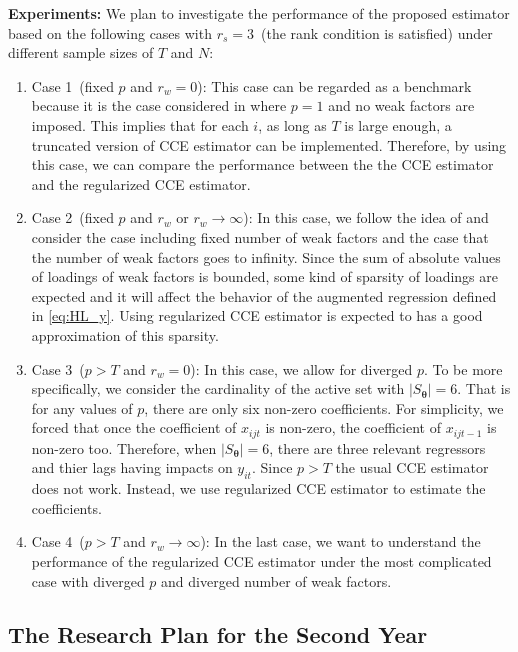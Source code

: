 \documentclass[11pt,a4paper]{article}
\newcommand{\Btheta}{\boldsymbol{\theta}}
\theoremstyle{definition}
\begin{document}
\noindent
\textbf{Experiments:} We plan to investigate the performance of the proposed estimator based on the following cases with $r_s=3$~(the rank condition is satisfied) under different sample sizes of $T$ and $N$:
\begin{enumerate}
\item Case 1~(fixed $p$ and $r_w=0$): This case can be regarded as a benchmark because it is the case considered in \citep{Chudik2015} where $p=1$ and no weak factors are imposed. This implies that for each $i$, as long as $T$ is large enough, a truncated version of CCE estimator can be implemented. Therefore, by using this case, we can compare the performance between the the CCE estimator and the regularized CCE estimator.
\item Case 2~(fixed $p$ and $r_w$ or $r_w\rightarrow\infty$): In this case, we follow the idea of \citep{Chudik2011b} and consider the case including fixed number of weak factors and the case that the number of weak factors goes to infinity. Since the sum of  absolute values of loadings of weak factors is bounded, some kind of sparsity of loadings are expected and it will affect the behavior of the augmented regression defined in \eqref{eq:HL_y}. Using regularized CCE estimator is expected to has a good approximation of this sparsity.
\item Case 3~($p>T$ and $r_w=0$): In this case, we allow for diverged $p$. To be more specifically, we consider the cardinality of the active set with $|S_{\Btheta}|=6$. That is for any values of $p$, there are only six non-zero coefficients. For simplicity, we forced that once the coefficient of $x_{ijt}$ is non-zero, the coefficient of $x_{ijt-1}$ is non-zero too. Therefore, when $|S_{\Btheta}|=6$, there are three relevant regressors and thier lags having impacts on $y_{it}$. Since $p>T$ the usual CCE estimator does not work. Instead, we use regularized CCE estimator to estimate the coefficients.
\item Case 4~($p>T$ and $r_w\rightarrow\infty$): In the last case, we want to understand the performance of the regularized CCE estimator under the most complicated case with diverged $p$ and diverged number of weak factors.
\end{enumerate}



\subsection{The Research Plan for the Second Year}
\end{document}
